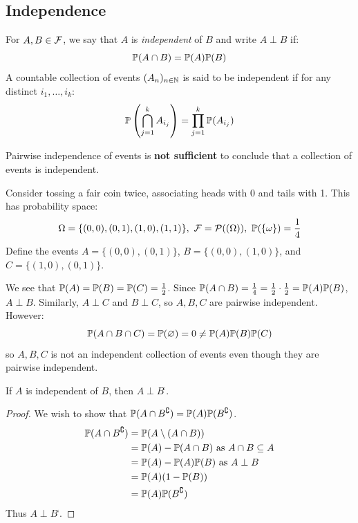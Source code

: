 \documentclass[../main.tex]{subfiles}
\begin{document}
\subsection{Independence}
\begin{definition}
  For $A, B \in \salg$, we say that $A$ is \textit{independent} of $B$ and write $A \perp B$ if:
  \label{independentEvents}
  \[
    \P(A \cap B) = \P(A) \P(B)
  \]
  A countable collection of events $(A_n)_{n \in \N}$ is said to be independent if for any distinct $i_1, \ldots, i_k$:
  \[
    \P\left(\bigcap_{j = 1}^{k} A_{i_j}\right) = \prod_{j = 1}^{k} \P(A_{i_j})
  \]
\end{definition}
\begin{remark}[Warning]
  Pairwise independence of events is \textbf{not sufficient} to conclude that a collection of events is independent.
\end{remark}
\begin{example}
  Consider tossing a fair coin twice, associating heads with 0 and tails with 1.
  This has probability space:
  \[
    \Omega = \{(0, 0), (0, 1), (1, 0), (1, 1)\},\ \salg = \powerset{(\Omega)},\ \P(\{\omega\}) = \frac{1}{4}
  \]
  Define the events $A = \{(0, 0), (0, 1)\}$, $B = \{(0, 0), (1, 0)\}$, and $C = \{(1, 0), (0, 1)\}$.

  We see that $\P(A) = \P(B) = \P(C) = \frac{1}{2}$.
  Since $\P(A \cap B) = \frac{1}{4} = \frac{1}{2} \cdot \frac{1}{2} = \P(A)\P(B)$, $A \perp B$.
  Similarly, $A \perp C$ and $B \perp C$, so $A, B, C$ are pairwise independent.
  However:
  \[
    \P(A \cap B \cap C) = \P(\emptyset) = 0 \neq \P(A)\P(B)\P(C)
  \]
  so $A, B, C$ is not an independent collection of events even though they are pairwise independent.
\end{example}
\begin{lemma}
  If $A$ is independent of $B$, then $A \perp B^{\comp}$.
\end{lemma}
\begin{proof}
  We wish to show that $\P(A \cap B^{\comp}) = \P(A)\P(B^{\comp})$.
  \begin{align*}
    \P(A \cap B^{\comp}) &= \P(A \setminus (A \cap B)) \\
                         &= \P(A) - \P(A \cap B) \text{ as $A \cap B \subseteq A$} \\
                         &= \P(A) - \P(A) \P(B) \text{ as $A \perp B$}\\
                         &= \P(A)(1 - \P(B)) \\
                         &= \P(A)\P(B^{\comp})
  \end{align*}
  Thus $A \perp B^{\comp}$.
\end{proof}
\end{document}
